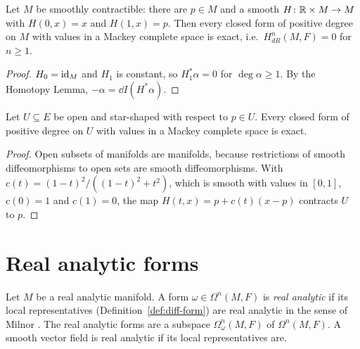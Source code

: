 \begin{theorem}
  \label{thm:poincare}
  \leanok
  Let $M$ be smoothly contractible: there are $p \in M$ and a smooth $H \colon \mathbb{R} \times M \to M$
  with $H(0, x) = x$ and $H(1, x) = p$. Then every closed form of positive degree on $M$ with
  values in a Mackey complete space is exact, i.e.\ $H^n_{dR}(M, F) = 0$ for $n \geq 1$.
\end{theorem}

\begin{proof}
  \leanok
  $H_0 = \mathrm{id}_M$ and $H_1$ is constant, so $H_1^*\alpha = 0$ for $\deg \alpha \geq 1$. By the
  Homotopy Lemma, $-\alpha = \dd I(H^*\alpha)$.
\end{proof}

\begin{corollary}[{\cite[Corollary~3.6.29]{GN26}}]
  \label{cor:poincare-star}
  \leanok
  Let $U \subseteq E$ be open and star-shaped with respect to $p \in U$. Every closed form of
  positive degree on $U$ with values in a Mackey complete space is exact.
\end{corollary}

\begin{proof}
  \leanok
  Open subsets of manifolds are manifolds, because restrictions of smooth diffeomorphisms to open
  sets are smooth diffeomorphisms. With $c(t) = (1 - t)^2/((1 - t)^2 + t^2)$, which is smooth with
  values in $[0, 1]$, $c(0) = 1$ and $c(1) = 0$, the map $H(t, x) = p + c(t)(x - p)$ contracts $U$
  to $p$.
\end{proof}

\section{Real analytic forms}

\begin{definition}
  \label{def:analytic-forms}
  \leanok
  Let $M$ be a real analytic manifold. A form $\omega \in \Omega^n(M, F)$ is \emph{real
  analytic} if its local representatives (Definition~\ref{def:diff-form}) are real analytic in
  the sense of Milnor \cite[Remark~3.6.18]{GN26}. The real analytic forms are a subspace
  $\Omega^n_\omega(M, F)$ of $\Omega^n(M, F)$. A smooth vector field is real analytic if its local
  representatives are.
\end{definition}

